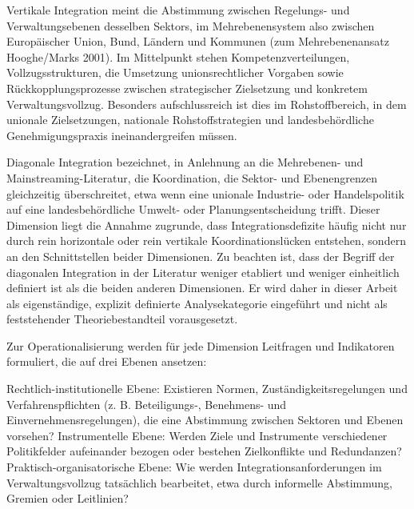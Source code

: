 \documentclass[12pt,a4paper,oneside]{book} %
\begin{document}
Vertikale Integration meint die Abstimmung zwischen Regelungs- und Verwaltungsebenen desselben Sektors, im Mehrebenensystem also zwischen Europäischer Union, Bund, Ländern und Kommunen (zum Mehrebenenansatz Hooghe/Marks 2001). Im Mittelpunkt stehen Kompetenzverteilungen, Vollzugsstrukturen, die Umsetzung unionsrechtlicher Vorgaben sowie Rückkopplungsprozesse zwischen strategischer Zielsetzung und konkretem Verwaltungsvollzug. Besonders aufschlussreich ist dies im Rohstoffbereich, in dem unionale Zielsetzungen, nationale Rohstoffstrategien und landesbehördliche Genehmigungspraxis ineinandergreifen müssen.

Diagonale Integration bezeichnet, in Anlehnung an die Mehrebenen- und Mainstreaming-Literatur, die Koordination, die Sektor- und Ebenengrenzen gleichzeitig überschreitet, etwa wenn eine unionale Industrie- oder Handelspolitik auf eine landesbehördliche Umwelt- oder Planungsentscheidung trifft. Dieser Dimension liegt die Annahme zugrunde, dass Integrationsdefizite häufig nicht nur durch rein horizontale oder rein vertikale Koordinationslücken entstehen, sondern an den Schnittstellen beider Dimensionen. Zu beachten ist, dass der Begriff der diagonalen Integration in der Literatur weniger etabliert und weniger einheitlich definiert ist als die beiden anderen Dimensionen. Er wird daher in dieser Arbeit als eigenständige, explizit definierte Analysekategorie eingeführt und nicht als feststehender Theoriebestandteil vorausgesetzt.

Zur Operationalisierung werden für jede Dimension Leitfragen und Indikatoren formuliert, die auf drei Ebenen ansetzen:

Rechtlich-institutionelle Ebene: Existieren Normen, Zuständigkeitsregelungen und Verfahrenspflichten (z. B. Beteiligungs-, Benehmens- und Einvernehmensregelungen), die eine Abstimmung zwischen Sektoren und Ebenen vorsehen?
Instrumentelle Ebene: Werden Ziele und Instrumente verschiedener Politikfelder aufeinander bezogen oder bestehen Zielkonflikte und Redundanzen?
Praktisch-organisatorische Ebene: Wie werden Integrationsanforderungen im Verwaltungsvollzug tatsächlich bearbeitet, etwa durch informelle Abstimmung, Gremien oder Leitlinien?
\end{document}

